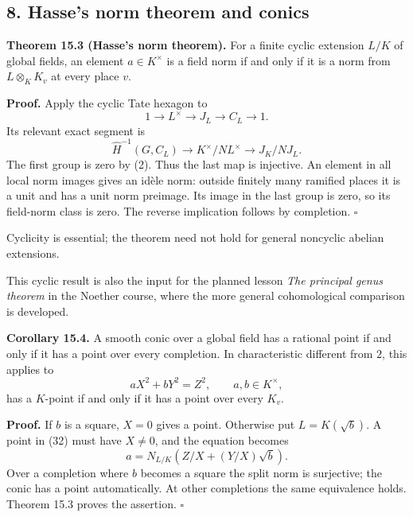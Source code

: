 \documentclass[11pt,a4paper]{article}
\begin{document}
\subsection{8. Hasse's norm theorem and
conics}\label{hasses-norm-theorem-and-conics}

\textbf{Theorem 15.3 (Hasse's norm theorem).} For a finite cyclic
extension \(L/K\) of global fields, an element \(a\in K^\times\) is a
field norm if and only if it is a norm from \(L\otimes_K K_v\) at every
place \(v\).

\textbf{Proof.} Apply the cyclic Tate hexagon to \[
1\longrightarrow L^\times\longrightarrow J_L
\longrightarrow C_L\longrightarrow1.
\] Its relevant exact segment is \[
\widehat H^{-1}(G,C_L)\longrightarrow
K^\times/NL^\times\longrightarrow J_K/NJ_L.
\tag{31}
\] The first group is zero by (2). Thus the last map is injective. An
element in all local norm images gives an idèle norm: outside finitely
many ramified places it is a unit and has a unit norm preimage. Its
image in the last group is zero, so its field-norm class is zero. The
reverse implication follows by completion. \(\square\)

Cyclicity is essential; the theorem need not hold for general noncyclic
abelian extensions.

This cyclic result is also the input for the planned lesson \emph{The
principal genus theorem} in the Noether course, where the more general
cohomological comparison is developed.

\textbf{Corollary 15.4.} A smooth conic over a global field has a
rational point if and only if it has a point over every completion. In
characteristic different from \(2\), this applies to \[
aX^2+bY^2=Z^2,\qquad a,b\in K^\times,
\tag{32}
\] has a \(K\)-point if and only if it has a point over every \(K_v\).

\textbf{Proof.} If \(b\) is a square, \(X=0\) gives a point. Otherwise
put \(L=K(\sqrt b)\). A point in (32) must have \(X\ne0\), and the
equation becomes \[
a=N_{L/K}\left(Z/X+(Y/X)\sqrt b\right).
\] Over a completion where \(b\) becomes a square the split norm is
surjective; the conic has a point automatically. At other completions
the same equivalence holds. Theorem 15.3 proves the assertion.
\(\square\)
\end{document}
